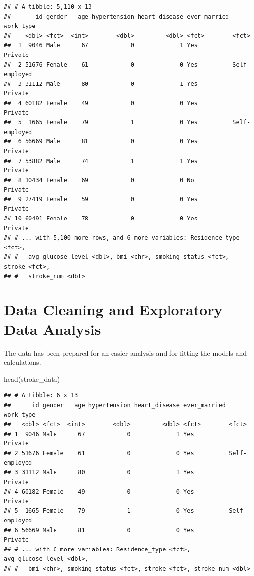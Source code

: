 \documentclass[
]{article}
\newenvironment{Shaded}{\begin{snugshade}}{\end{snugshade}}
\newcommand{\FunctionTok}[1]{\textcolor[rgb]{0.00,0.00,0.00}{#1}}
\newcommand{\NormalTok}[1]{#1}
\renewcommand{\=}[1]{\stackrel{#1}{=}}
\theoremstyle{definition}
\theoremstyle{remark}
\begin{document}
\begin{verbatim}
## # A tibble: 5,110 x 13
##       id gender   age hypertension heart_disease ever_married work_type    
##    <dbl> <fct>  <int>        <dbl>         <dbl> <fct>        <fct>        
##  1  9046 Male      67            0             1 Yes          Private      
##  2 51676 Female    61            0             0 Yes          Self-employed
##  3 31112 Male      80            0             1 Yes          Private      
##  4 60182 Female    49            0             0 Yes          Private      
##  5  1665 Female    79            1             0 Yes          Self-employed
##  6 56669 Male      81            0             0 Yes          Private      
##  7 53882 Male      74            1             1 Yes          Private      
##  8 10434 Female    69            0             0 No           Private      
##  9 27419 Female    59            0             0 Yes          Private      
## 10 60491 Female    78            0             0 Yes          Private      
## # ... with 5,100 more rows, and 6 more variables: Residence_type <fct>,
## #   avg_glucose_level <dbl>, bmi <chr>, smoking_status <fct>, stroke <fct>,
## #   stroke_num <dbl>
\end{verbatim}

\hypertarget{data-cleaning-and-exploratory-data-analysis}{%
\section{Data Cleaning and Exploratory Data Analysis}\label{data-cleaning-and-exploratory-data-analysis}}

The data has been prepared for an easier analysis and for fitting the models and calculations.

\begin{Shaded}
\begin{Highlighting}[]
\FunctionTok{head}\NormalTok{(stroke\_data)}
\end{Highlighting}
\end{Shaded}

\begin{verbatim}
## # A tibble: 6 x 13
##      id gender   age hypertension heart_disease ever_married work_type    
##   <dbl> <fct>  <int>        <dbl>         <dbl> <fct>        <fct>        
## 1  9046 Male      67            0             1 Yes          Private      
## 2 51676 Female    61            0             0 Yes          Self-employed
## 3 31112 Male      80            0             1 Yes          Private      
## 4 60182 Female    49            0             0 Yes          Private      
## 5  1665 Female    79            1             0 Yes          Self-employed
## 6 56669 Male      81            0             0 Yes          Private      
## # ... with 6 more variables: Residence_type <fct>, avg_glucose_level <dbl>,
## #   bmi <chr>, smoking_status <fct>, stroke <fct>, stroke_num <dbl>
\end{verbatim}
\end{document}
